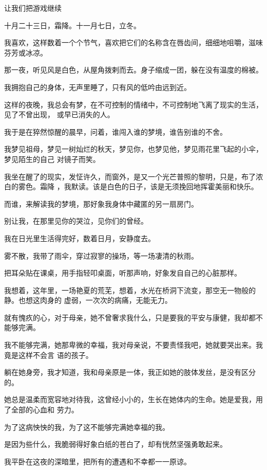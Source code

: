 \documentclass[12pt,a4paper]{article}
\begin{document}
		让我们把游戏继续

	\endwriting



		十月二十三日，霜降。十一月七日，立冬。

		我喜欢，这样数着一个个节气，喜欢把它们的名称含在唇齿间，细细地咀嚼，滋味芬芳或冰凉。

		那一夜，听见风是白色，从屋角拨剌而去。身子缩成一团，躲在没有温度的棉被。

		我拥抱自己的身体，无声里睡了，只有风的低吟由远到近。

		这样的夜晚，我总会有梦，在不可控制的情绪中，不可控制地飞离了现实的生活，见了不曾出现，
	或早已消失的人。

		我于是在猝然惊醒的晨早，问着，谁闯入谁的梦境，谁告别谁的不舍。

		我梦见祖母，梦见一树灿烂的秋天，梦见你，也梦见他，梦见雨花里飞起的小伞，梦见陌生的自己
	对镜子而笑。

		我坐在醒了的现实，发怔许久，而窗外，是又一个光芒普照的黎明，只是，布了浓白的雾色。霜降
	，我默读。该是白色的日子，该是无须挽回地挥霍美丽和快乐。


		而谁，来解读我的梦境，那好象我身体中藏匿的另一扇房门。

		别让我，在那里见你的哭泣，见你们的曾经。


		我在日光里生活得完好，数着日月，安静度去。


		雾不散，我带了雨伞，穿过寂寥的操场，等一场凄清的秋雨。

		把耳朵贴在课桌，用手指轻叩桌面，听那声响，好象发自自己的心脏那样。


		我想着，这年里，一场艳夏的荒芜，想着，水光在桥洞下流变，那空无一物般的静。也想这肉身的
	虚弱，一次次的病痛，无能无力。


		就有愧疚的心，对于母亲，她不曾奢求我什么，只是要我的平安与康健，我却都不能够完满。


		我不能够完满，她那卑微的幸福，我对母亲说，不要责怪我吧，她就要哭出来。我竟是这样不会言
	语的孩子。

		躺在她身旁，我才知道，我和母亲原是一体，我正如她的肢体发丝，是没有区分的。

		她总是温柔而宽容地对待我，这曾经小小的，生长在她体内的生命。她是爱我，用了全部的心血和
	劳力。

		为了这病怏怏的我，为了这不能够完满她幸福的我。


		是因为些什么，我脆弱得好象白纸的苍白了，却有恍然坚强勇敢起来。

		我平卧在这夜的深暗里，把所有的遭遇和不幸都一一原谅。
\end{document}
